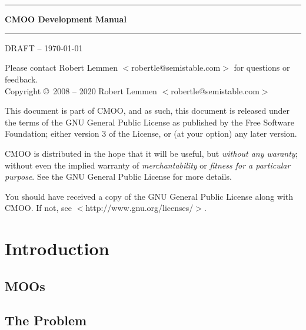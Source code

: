 \documentclass[12pt,a4paper]{article}
\let\oldsection\section
\renewcommand\section{\clearpage\oldsection}
\begin{document}
\thispagestyle{empty}
~\\~\vspace{3cm}
\begin{center}
\rule{\textwidth}{1.5pt}\vspace{8mm}
{\Huge\bf CMOO Development Manual}\vspace{4mm}
\rule{\textwidth}{1.5pt}\vspace{10mm}
\end{center}
\clearpage

\thispagestyle{empty}
DRAFT -- \today

Please contact Robert Lemmen $<$robertle@semistable.com$>$ for questions or
feedback.
\\
Copyright \copyright~2008 -- 2020 Robert Lemmen $<$robertle@semistable.com$>$

This document is part of CMOO, and as such, this document is released under the terms of the GNU General Public License as published by the Free Software Foundation; either version 3 of the License, or (at your option) any later version.

CMOO is distributed in the hope that it will be useful, but {\em without any
waranty}; without even the implied warranty of {\em merchantability} or {\em
fitness for a particular purpose}.  See the GNU General Public License for more details.

You should have received a copy of the GNU General Public License along with CMOO. If not, see $<$http://www.gnu.org/licenses/$>$.
\cleardoublepage

\tableofcontents
\cleardoublepage

\section{Introduction}\label{sec:introduction}

\subsection{MOOs}


\subsection{The Problem}
\end{document}
